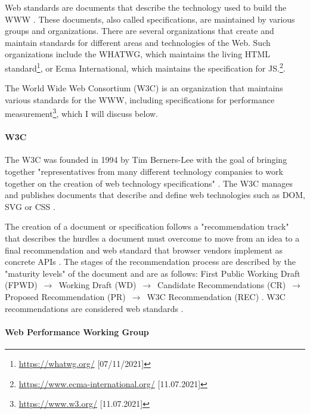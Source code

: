 Web standards are documents that describe the technology used to build the WWW \cite{2021MDNWebStandards}.
These documents, also called specifications, are maintained by various groups and organizations.
There are several organizations that create and maintain standards for different areas and technologies of the Web.
Such organizations include the WHATWG, which maintains the living HTML standard\footnote{\url{https://whatwg.org/} [07/11/2021]}, or Ecma International, which maintains the specification for JS.\footnote{\url{https://www.ecma-international.org/} [11.07.2021]}.

The World Wide Web Consortium (W3C) is an organization that maintains various standards for the WWW, including specifications for performance measurement\footnote{\url{https://www.w3.org/} [11.07.2021]}, which I will discuss below.


\paragraph{W3C} %


The W3C was founded in 1994 by Tim Berners-Lee with the goal of bringing together "representatives from many different technology companies to work together on the creation of web technology specifications" \cite{2021MDNWebStandards}.
The W3C manages and publishes documents that describe and define web technologies such as DOM, SVG or CSS \cite{2021W3CFAQ}.



The creation of a document or specification follows a "recommendation track" that describes the hurdles a document must overcome to move from an idea to a final recommendation and web standard that browser vendors implement as concrete APIs \cite{2020W3CProcessDocument}.
The stages of the recommendation process are described by the "maturity levels" of the document and are as follows:
First Public Working Draft (FPWD) $\,\to\,$ Working Draft (WD) $\,\to\,$ Candidate Recommendations (CR) $\,\to\,$ Proposed Recommendation (PR) $\,\to\,$ W3C Recommendation (REC) \cite{2015W3CProcessDocument}.
W3C recommendations are considered web standards \cite{2021W3CFAQ}.



\paragraph{Web Performance Working Group} %

